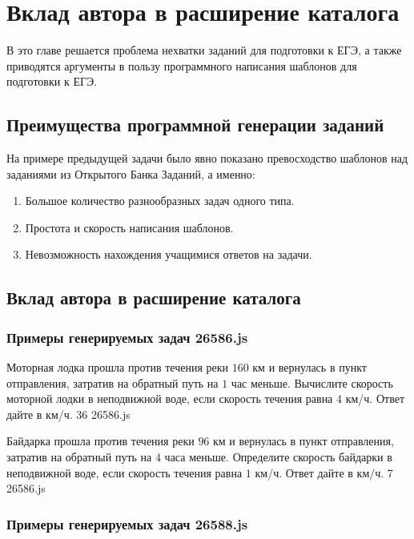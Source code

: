 \section{Вклад автора в расширение каталога}\label{2sect}
В это главе решается проблема нехватки заданий для подготовки к ЕГЭ, а также приводятся аргументы в пользу программного написания шаблонов для подготовки к ЕГЭ.

\subsection{Преимущества программной генерации заданий}
На примере предыдущей задачи было явно показано превосходство шаблонов над заданиями из Открытого Банка Заданий, а именно:
\begin{enumerate}
	\item Большое количество разнообразных задач одного типа. 
	\item Простота и скорость написания шаблонов. 
    \item Невозможность нахождения учащимися ответов на задачи.
\end{enumerate}

\subsection{Вклад автора в расширение каталога}


\subsubsection*{Примеры генерируемых задач 26586.js}
 
\par{Моторная лодка прошла против течения реки $160$ км и вернулась в пункт отправления, затратив на обратный путь на $1$ час меньше. Вычислите скорость моторной лодки в неподвижной воде, если скорость течения равна $4$ км/ч. Ответ дайте в км/ч. }{ 36 }{26586.js}
\par{Байдарка прошла против течения реки $96$ км и вернулась в пункт отправления, затратив на обратный путь на $4$ часа меньше. Определите скорость байдарки в неподвижной воде, если скорость течения равна $1$ км/ч. Ответ дайте в км/ч. }{ 7 }{26586.js}


\subsubsection*{Примеры генерируемых задач 26588.js}   

